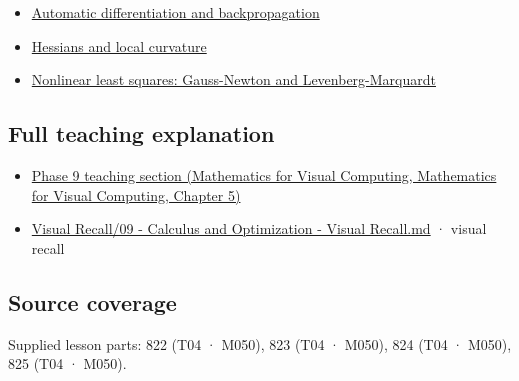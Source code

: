 \begin{itemize}
\tightlist
\item
  \hyperref[appendix-40df0855b4a7]{Automatic differentiation and backpropagation}
\item
  \hyperref[appendix-6ac071f8b50c]{Hessians and local curvature}
\item
  \hyperref[appendix-2c2df8345991]{Nonlinear least squares: Gauss-Newton and Levenberg-Marquardt}
\end{itemize}

\subsection{Full teaching explanation}\label{appendix-d8a7ddb675eb-full-teaching-explanation}

\begin{itemize}
\tightlist
\item
  \href{../02-Mathematics-for-Visual-Computing/main.pdf\#nameddest=02-foundations-ii-ch021-jacobians-curvature-and-local-approximation}{Phase 9 teaching section (Mathematics for Visual Computing, Mathematics for Visual Computing, Chapter 5)}
\item
  \hyperref[appendix-adf48f5dc5c1]{Visual Recall/09 - Calculus and Optimization - Visual Recall.md} · visual recall
\end{itemize}

\subsection{Source coverage}\label{appendix-d8a7ddb675eb-source-coverage}

Supplied lesson parts: 822 (T04 · M050), 823 (T04 · M050), 824 (T04 · M050), 825 (T04 · M050).
